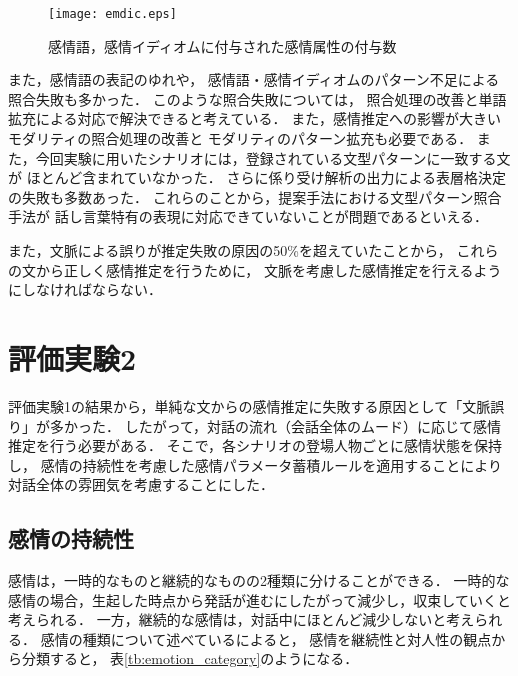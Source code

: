\documentclass[japanese]{jnlp_1.3c}
\begin{document}
\begin{figure}[b]
\begin{center}
    \texttt{[image: emdic.eps]}
\caption{感情語，感情イディオムに付与された感情属性の付与数}
\label{fig:emotion_dictionary}
\end{center}
\end{figure}


また，感情語の表記のゆれや，
感情語・感情イディオムのパターン不足による照合失敗も多かった．
このような照合失敗については，
照合処理の改善と単語拡充による対応で解決できると考えている．
また，感情推定への影響が大きいモダリティの照合処理の改善と
モダリティのパターン拡充も必要である．
また，今回実験に用いたシナリオには，登録されている文型パターンに一致する文が
ほとんど含まれていなかった．
さらに係り受け解析の出力による表層格決定の失敗も多数あった．
これらのことから，提案手法における文型パターン照合手法が
話し言葉特有の表現に対応できていないことが問題であるといえる．

また，文脈による誤りが推定失敗の原因の50\%を超えていたことから，
これらの文から正しく感情推定を行うために，
文脈を考慮した感情推定を行えるようにしなければならない．


\section{評価実験2}

評価実験1の結果から，単純な文からの感情推定に失敗する原因として「文脈誤り」が多かった．
したがって，対話の流れ（会話全体のムード）に応じて感情推定を行う必要がある．
そこで，各シナリオの登場人物ごとに感情状態を保持し，
感情の持続性を考慮した感情パラメータ蓄積ルールを適用することにより対話全体の雰囲気を考慮することにした．
\subsection{感情の持続性}
感情は，一時的なものと継続的なものの2種類に分けることができる．
一時的な感情の場合，生起した時点から発話が進むにしたがって減少し，収束していくと考えられる．
一方，継続的な感情は，対話中にほとんど減少しないと考えられる．
感情の種類について述べている\cite{emotion_psychology}によると，
感情を継続性と対人性の観点から分類すると，
表\ref{tb:emotion_category}のようになる．
\end{document}
